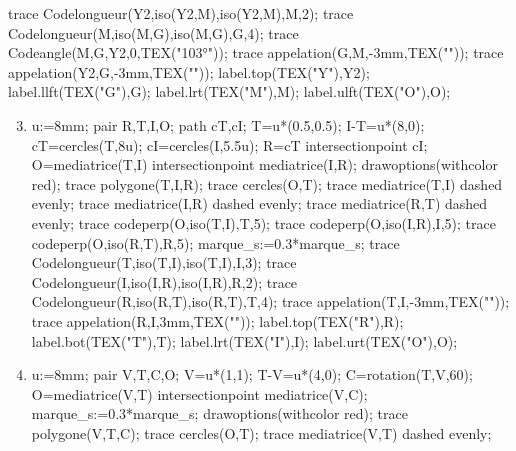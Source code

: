 \begin{corrige}
\begin{enumerate}
\begin{Geometrie}[CoinBG={(-1.05u,-1.4u)},CoinHD={(7u,5.25u)}]
            trace Codelongueur(Y2,iso(Y2,M),iso(Y2,M),M,2);
            trace Codelongueur(M,iso(M,G),iso(M,G),G,4);
            trace Codeangle(M,G,Y2,0,TEX("\ang{103}"));
            trace appelation(G,M,-3mm,TEX(""));
            trace appelation(Y2,G,-3mm,TEX(""));
            label.top(TEX("Y"),Y2);
            label.llft(TEX("G"),G);
            label.lrt(TEX("M"),M);
            label.ulft(TEX("O"),O);
         \end{Geometrie}
   \end{enumerate}
   \Coupe
   \begin{enumerate}
      \setcounter{enumi}{2}
      \item\hfil\newline
         \begin{Geometrie}[CoinBG={(0,-2u)},CoinHD={(8u,5.6u)}]
            u:=8mm;
            pair R,T,I,O;
            path cT,cI;
            T=u*(0.5,0.5);
            I-T=u*(8,0);
            cT=cercles(T,8u);
            cI=cercles(I,5.5u);
            R=cT intersectionpoint cI;
            O=mediatrice(T,I) intersectionpoint mediatrice(I,R);
            drawoptions(withcolor red);
            trace polygone(T,I,R);
            trace cercles(O,T);
            trace mediatrice(T,I) dashed evenly;
            trace mediatrice(I,R) dashed evenly;
            trace mediatrice(R,T) dashed evenly;
            trace codeperp(O,iso(T,I),T,5);
            trace codeperp(O,iso(I,R),I,5);
            trace codeperp(O,iso(R,T),R,5);
            marque_s:=0.3*marque_s;
            trace Codelongueur(T,iso(T,I),iso(T,I),I,3);
            trace Codelongueur(I,iso(I,R),iso(I,R),R,2);
            trace Codelongueur(R,iso(R,T),iso(R,T),T,4);
            trace appelation(T,I,-3mm,TEX(""));
            trace appelation(R,I,3mm,TEX(""));
            label.top(TEX("R"),R);
            label.bot(TEX("T"),T);
            label.lrt(TEX("I"),I);
            label.urt(TEX("O"),O);
         \end{Geometrie}
      \item\hfil\newline
      \begin{Geometrie}[CoinBG={(-u,-0.5u)},CoinHD={(4.8u,4.8u)}]
         u:=8mm;
         pair V,T,C,O;
         V=u*(1,1);
         T-V=u*(4,0);
         C=rotation(T,V,60);
         O=mediatrice(V,T) intersectionpoint mediatrice(V,C);
         marque_s:=0.3*marque_s;
         drawoptions(withcolor red);
         trace polygone(V,T,C);
         trace cercles(O,T);
         trace mediatrice(V,T) dashed evenly;

\end{Geometrie}
\end{enumerate}
\end{corrige}

